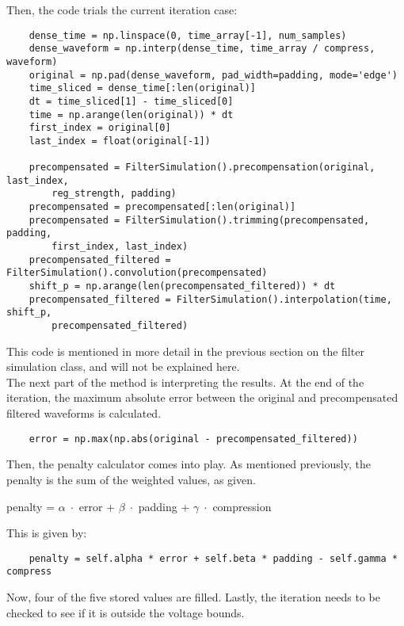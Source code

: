 \documentclass[11pt, a4paper]{article}
\theoremstyle{definition}
\numberwithin{equation}{section}
\begin{document}
Then, the code trials the current iteration case:

\begin{verbatim}
    dense_time = np.linspace(0, time_array[-1], num_samples)
    dense_waveform = np.interp(dense_time, time_array / compress, waveform)
    original = np.pad(dense_waveform, pad_width=padding, mode='edge')
    time_sliced = dense_time[:len(original)]
    dt = time_sliced[1] - time_sliced[0]
    time = np.arange(len(original)) * dt
    first_index = original[0]
    last_index = float(original[-1])
    
    precompensated = FilterSimulation().precompensation(original, last_index, 
        reg_strength, padding)
    precompensated = precompensated[:len(original)]
    precompensated = FilterSimulation().trimming(precompensated, padding, 
        first_index, last_index)
    precompensated_filtered = FilterSimulation().convolution(precompensated)
    shift_p = np.arange(len(precompensated_filtered)) * dt
    precompensated_filtered = FilterSimulation().interpolation(time, shift_p, 
        precompensated_filtered)
\end{verbatim}

This code is mentioned in more detail in the previous section on the filter simulation class, and will not be explained here.
\\
The next part of the method is interpreting the results. At the end of the iteration, the maximum absolute error between the original and precompensated filtered waveforms is calculated.
\begin{verbatim}
    error = np.max(np.abs(original - precompensated_filtered))
\end{verbatim}

Then, the penalty calculator comes into play. As mentioned previously, the penalty is the sum of the weighted values, as given.

\begin{center}
    penalty = $\alpha \; \cdot$ error + $\beta \; \cdot$ padding + $\gamma \; \cdot$ compression
\end{center}

This is given by:

\begin{verbatim}
    penalty = self.alpha * error + self.beta * padding - self.gamma * compress
\end{verbatim}

Now, four of the five stored values are filled. Lastly, the iteration needs to be checked to see if it is outside the voltage bounds.
\end{document}
